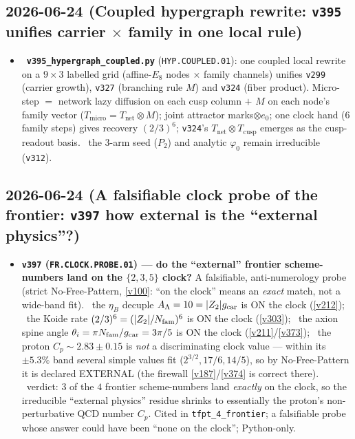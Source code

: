 \subsection*{2026-06-24 (Coupled hypergraph rewrite: \texttt{v395} unifies carrier $\times$ family in one local rule)}
\begin{itemize}
  \item \mE\ \textbf{\texttt{v395\_hypergraph\_coupled.py}} (\texttt{HYP.COUPLED.01}): one coupled local rewrite on a $9\times3$ labelled grid (affine-$E_8$ nodes $\times$ family channels) unifies \texttt{v299} (carrier growth), \texttt{v327} (branching rule $M$) and \texttt{v324} (fiber product). Micro-step $=$ network lazy diffusion on each cusp column $+$ $M$ on each node's family vector ($T_{\mathrm{micro}}=T_{\mathrm{net}}\otimes M$); joint attractor marks$\otimes e_0$; one clock hand ($6$ family steps) gives recovery $(2/3)^6$; \texttt{v324}'s $T_{\mathrm{net}}\otimes T_{\mathrm{cusp}}$ emerges as the cusp-readout basis. \mO\ the $3$-arm seed ($P_2$) and analytic $\varphi_0$ remain irreducible (\texttt{v312}).
\end{itemize}

\subsection*{2026-06-24 (A falsifiable clock probe of the frontier: \texttt{v397} how external is the ``external physics''?)}
\begin{itemize}
\item \textbf{\texttt{v397} (\texttt{FR.CLOCK.PROBE.01}) --- do the ``external'' frontier scheme-numbers land on the
$\{2,3,5\}$ clock?} A falsifiable, anti-numerology probe (strict No-Free-Pattern, \vref{v100}: ``on the clock'' means
an \emph{exact} match, not a wide-band fit). \mE\ the $\eta_B$ decuple $A_\Lambda=10=|Z_2|g_{\mathrm{car}}$ is ON the clock
(\vref{v212}); \mE\ the Koide rate $(2/3)^6=(|Z_2|/N_{\mathrm{fam}})^6$ is ON the clock (\vref{v303}); \mE\ the axion spine angle
$\theta_i=\pi N_{\mathrm{fam}}/g_{\mathrm{car}}=3\pi/5$ is ON the clock (\vref{v211}/\vref{v373}); \mE\ the proton $C_p\sim2.83\pm0.15$ is
\emph{not} a discriminating clock value --- within its $\pm5.3\%$ band several simple values fit
($2^{3/2},17/6,14/5$), so by No-Free-Pattern it is declared EXTERNAL (the firewall \vref{v187}/\vref{v374} is correct
there). \mC\ verdict: $3$ of the $4$ frontier scheme-numbers land \emph{exactly} on the clock, so the irreducible
``external physics'' residue shrinks to essentially the proton's non-perturbative QCD number $C_p$. Cited in
\texttt{tfpt\_4\_frontier}; a falsifiable probe whose answer could have been ``none on the clock''; Python-only.
\end{itemize}

